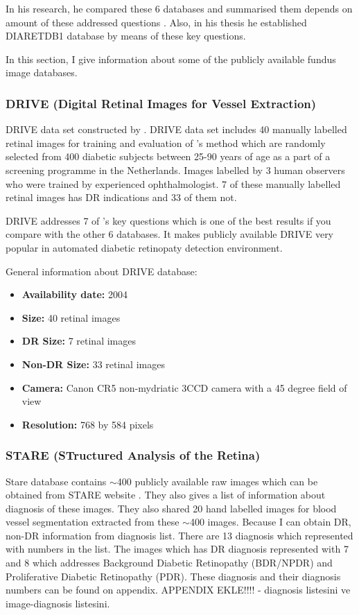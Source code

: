 In his research, he compared these 6 databases and summarised them depends on amount of these addressed questions \citep{kauppi2013constructing}. Also, in his thesis he established DIARETDB1 database by means of these key questions.

In this section, I give information about some of the publicly available fundus image databases.

\subsubsection{DRIVE (Digital Retinal Images for Vessel Extraction)}
DRIVE data set constructed by \citet{staal2004ridge}.
DRIVE data set includes 40 manually labelled retinal images for training and evaluation of \citet{staal2004ridge}'s method which are randomly selected from 400 diabetic subjects between 25-90 years of age as a part of a screening programme in the Netherlands. Images labelled by 3 human observers who were trained by experienced ophthalmologist. 7 of these manually labelled retinal images has DR indications and 33 of them not. 

DRIVE addresses 7 of \citet{kauppi2013constructing}'s key questions which is one of the best results if you compare with the other 6 databases. It makes publicly available DRIVE very popular in automated diabetic retinopaty detection environment.

General information about DRIVE database:
\begin{itemize}
    \item \textbf{Availability date: } 2004
    \item \textbf{Size: } 40 retinal images
    \item \textbf{DR Size: } 7 retinal images
    \item \textbf{Non-DR Size: } 33 retinal images
    \item \textbf{Camera: } Canon CR5 non-mydriatic 3CCD camera with a 45 degree field of view
    \item \textbf{Resolution: } 768 by 584 pixels
\end{itemize}

\subsubsection{STARE (STructured Analysis of the Retina)}
Stare database contains $\sim$400 publicly available raw images which can be obtained from STARE website \citep{STARE}. They also gives a list of information about diagnosis of these images. They also shared 20 hand labelled images for blood vessel segmentation \citep{hoover2000locating} extracted from these $\sim$400 images. Because I can obtain DR, non-DR information from diagnosis list. There are 13 diagnosis which represented with numbers in the list. The images which has DR diagnosis represented with 7 and 8 which addresses Background Diabetic Retinopathy (BDR/NPDR) and Proliferative Diabetic Retinopathy (PDR). These diagnosis and their diagnosis numbers can be found on appendix. {APPENDIX EKLE!!!!} - diagnosis listesini ve image-diagnosis listesini.

